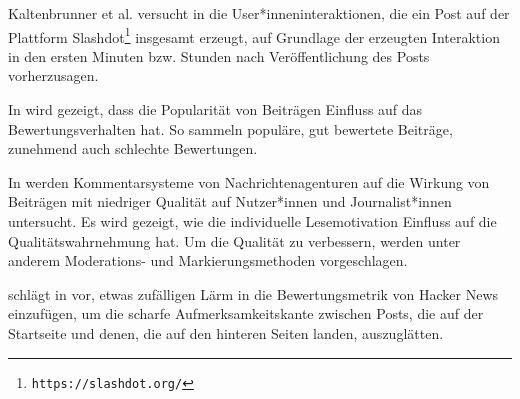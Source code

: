 Kaltenbrunner et al. versucht in \cite{Kaltenbrunner200757} die User*inneninteraktionen, die ein Post auf der Plattform Slashdot\footnote{\texttt{https://slashdot.org/}} insgesamt erzeugt, auf Grundlage der erzeugten Interaktion in den ersten Minuten bzw. Stunden nach Veröffentlichung des Posts vorherzusagen. 

In \cite{Wu2008334} wird gezeigt, dass die Popularität von Beiträgen Einfluss auf das Bewertungsverhalten hat. So sammeln populäre, gut bewertete Beiträge, zunehmend auch schlechte Bewertungen.

In \cite{Diakopoulos2011133}  werden Kommentarsysteme von Nachrichtenagenturen auf die Wirkung von Beiträgen mit niedriger Qualität auf Nutzer*innen und Journalist*innen untersucht. Es wird gezeigt, wie die individuelle Lesemotivation Einfluss auf die Qualitätswahrnehmung hat. Um die Qualität zu verbessern, werden unter anderem Moderations- und Markierungsmethoden vorgeschlagen.

\citeauthor{Luu} schlägt in \cite{Luu} vor, etwas zufälligen Lärm in die Bewertungsmetrik von Hacker News einzufügen, um die scharfe Aufmerksamkeitskante zwischen Posts, die auf der Startseite und denen, die auf den hinteren Seiten landen, auszuglätten.
